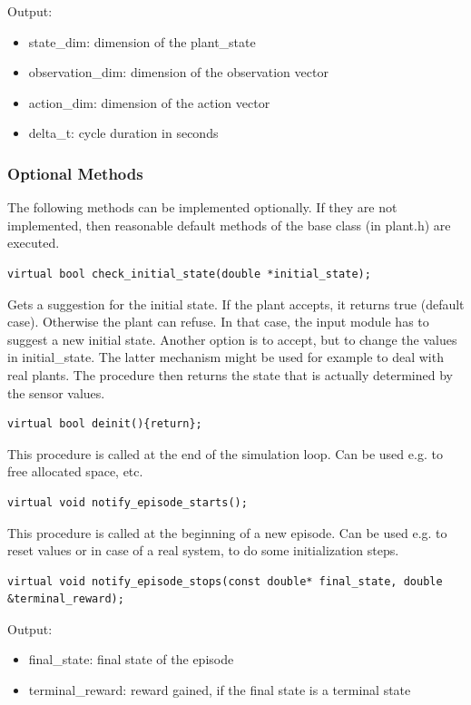 \documentclass[a4paper,12pt,german]{article}
\newcommand{\ite}{\begin{itemize}}
\newcommand{\eti}{\end{itemize}}
\begin{document}
Output: 
\ite
\item state\_dim: dimension of the plant\_state
\item observation\_dim: dimension of the observation vector
\item action\_dim: dimension of the action vector
\item delta\_t: cycle duration in seconds 
\eti

\subsubsection{Optional Methods}

The following methods can be implemented optionally. If they are not implemented, then
reasonable default methods of the base class (in plant.h) are executed.

\begin{verbatim}
virtual bool check_initial_state(double *initial_state); 
\end{verbatim}

Gets a suggestion for the initial state. If the plant accepts, 
it returns true (default case). Otherwise the plant can refuse. In that case, the input module
has to suggest a new initial state. Another option is to accept, but to change the
values in initial\_state. The latter mechanism might be used for example to deal with 
real plants. The procedure then returns the state that is actually determined by the sensor values.


\begin{verbatim}
virtual bool deinit(){return};
\end{verbatim}

This procedure is called at the end of the simulation loop. Can be used e.g. to free allocated space, etc.

\begin{verbatim}
virtual void notify_episode_starts();
\end{verbatim}


This procedure is called at the beginning of a new episode. Can be used e.g. to reset values
or in case of a real system, to do some initialization steps.


\begin{verbatim}
virtual void notify_episode_stops(const double* final_state, double &terminal_reward);
\end{verbatim}

Output:
\ite
\item  final\_state: final state of the episode
\item terminal\_reward: reward gained, if the final state is a terminal state
\eti
\end{document}
